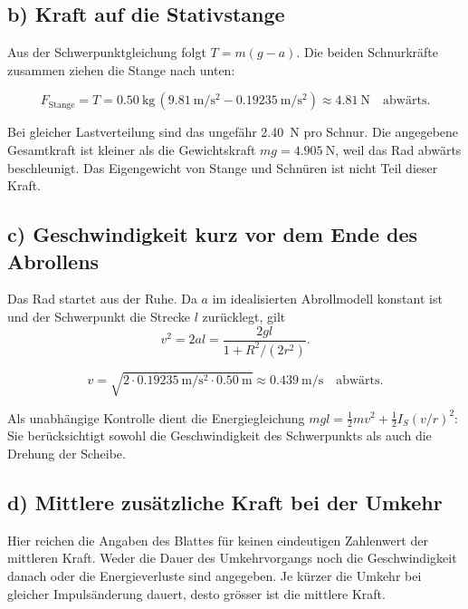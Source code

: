 \subsection*{b) Kraft auf die Stativstange}
Aus der Schwerpunktgleichung folgt $T=m(g-a)$. Die beiden Schnurkräfte
zusammen ziehen die Stange nach unten:
\begin{ergebnis}
\begin{equation*}
  F_{\mathrm{Stange}}=T
    =\qty{0.50}{\kilogram}\,
      (\qty{9.81}{\metre\per\second\squared}
       -\qty{0.19235}{\metre\per\second\squared})
    \approx\qty{4.81}{\newton}\quad\text{abwärts}.
\end{equation*}
\end{ergebnis}
Bei gleicher Lastverteilung sind das ungefähr \qty{2.40}{\newton} pro Schnur.
Die angegebene Gesamtkraft ist kleiner als die Gewichtskraft
$mg=\qty{4.905}{\newton}$, weil das Rad abwärts beschleunigt. Das Eigengewicht
von Stange und Schnüren ist nicht Teil dieser Kraft.

\subsection*{c) Geschwindigkeit kurz vor dem Ende des Abrollens}
Das Rad startet aus der Ruhe. Da $a$ im idealisierten Abrollmodell konstant
ist und der Schwerpunkt die Strecke $l$ zurücklegt, gilt
\begin{equation}
  v^2=2al
  =\frac{2gl}{1+R^2/(2r^2)}.
\end{equation}
\begin{ergebnis}[c) Geschwindigkeit]
\begin{equation*}
  v=\sqrt{2\cdot\qty{0.19235}{\metre\per\second\squared}
              \cdot\qty{0.50}{\metre}}
    \approx\qty{0.439}{\metre\per\second}\quad\text{abwärts}.
\end{equation*}
\end{ergebnis}
Als unabhängige Kontrolle dient die Energiegleichung
$mgl=\tfrac12 mv^2+\tfrac12 I_S(v/r)^2$: Sie berücksichtigt sowohl die
Geschwindigkeit des Schwerpunkts als auch die Drehung der Scheibe.

\subsection*{d) Mittlere zusätzliche Kraft bei der Umkehr}
Hier reichen die Angaben des Blattes für keinen eindeutigen Zahlenwert der
mittleren Kraft. Weder die Dauer des Umkehrvorgangs noch die Geschwindigkeit
danach oder die Energieverluste sind angegeben. Je kürzer die Umkehr bei gleicher
Impulsänderung dauert, desto grösser ist die mittlere Kraft.


